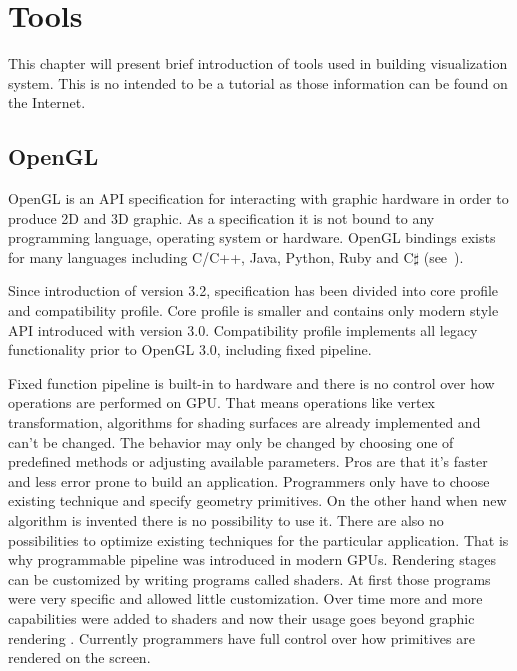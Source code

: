 

\chapter{Tools}


\graphicspath{{tools/figures/}}


This chapter will present brief introduction of tools used in building visualization system. This is no intended to be a tutorial as those information can be found on the Internet. 

\section{OpenGL}
OpenGL is an API specification for interacting with graphic hardware in order to produce 2D and 3D graphic. 
As a specification it is not bound to any programming language, operating system or hardware. 
OpenGL bindings exists for many languages including C/C++, Java, Python, Ruby and C$\sharp$ (see~\cite{OglBindings}). 

Since introduction of version 3.2, specification has been divided into core profile and compatibility profile. Core profile is smaller and contains only modern style API introduced with version 3.0. Compatibility profile implements all legacy functionality prior to OpenGL 3.0, including fixed pipeline. 

Fixed function pipeline is built-in to hardware and there is no control over how operations are performed on GPU. That means operations like vertex transformation, algorithms for shading surfaces are already implemented and can't be changed. The behavior may only be changed by choosing one of predefined methods or adjusting available parameters. Pros are that it's faster and less error prone to build an application. Programmers only have to choose existing technique and specify geometry primitives. On the other hand when new algorithm is invented there is no possibility to use it. There are also no possibilities to optimize existing techniques for the particular application. 
That is why programmable pipeline was introduced in modern GPUs. Rendering stages can be customized by writing programs called shaders. At first those programs were very specific and allowed little customization. Over time more and more capabilities were added to shaders and now their usage goes beyond graphic rendering \cite[Part~VI]{GPUGems3}. Currently programmers have full control over how primitives are rendered on the screen.


